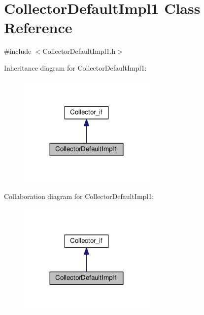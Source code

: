 \hypertarget{class_collector_default_impl1}{}\section{Collector\+Default\+Impl1 Class Reference}
\label{class_collector_default_impl1}


{\ttfamily \#include $<$Collector\+Default\+Impl1.\+h$>$}



Inheritance diagram for Collector\+Default\+Impl1\+:\nopagebreak
\begin{figure}[H]
\begin{center}
\leavevmode
\includegraphics[width=191pt]{class_collector_default_impl1__inherit__graph}
\end{center}
\end{figure}


Collaboration diagram for Collector\+Default\+Impl1\+:\nopagebreak
\begin{figure}[H]
\begin{center}
\leavevmode
\includegraphics[width=191pt]{class_collector_default_impl1__coll__graph}
\end{center}
\end{figure}
